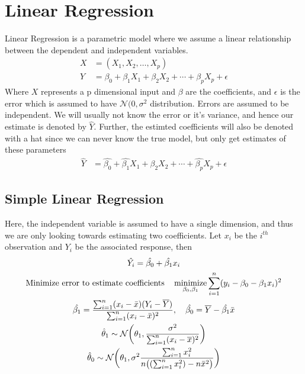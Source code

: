 \documentclass[../statistical_learning_notes.tex]{subfiles}
\begin{document}
\chapter{Linear Regression}
Linear Regression is a parametric model where we assume a linear relationship between the dependent and independent variables.
\begin{align*}
    X &= (X_{1}, X_{2}, \ldots, X_{p})\\
    Y &= \beta_{0} + \beta_{1}X_{1} + \beta_{2}X_{2} + \cdots + \beta_{p}X_{p} + \epsilon
\end{align*}
Where $X$ represents a p dimensional input and $\beta$ are the coefficients, and $\epsilon$ is the error which is assumed to have $\mathcal{N}(0, \sigma^{2}$ distribution. Errors are assumed to be independent. We will usually not know the error or it's variance, and hence our estimate is denoted by $\hat{Y}$. Further, the estimted coefficients will also be denoted with a hat since we can never know the true model, but only get estimates of these parameters
\begin{align*}
    \hat{Y} &= \hat{\beta_{0}} + \hat{\beta_{1}}X_{1} + \beta_{2}X_{2} + \cdots + \hat{\beta_{p}}X_{p} + \epsilon
\end{align*}

\section{Simple Linear Regression}
Here, the independent variable is assumed to have a single dimension, and thus we are only looking towards estimating two coefficients. Let $x_{i}$ be the $i^{th}$ observation and ${Y_{i}}$ be the associated response, then 
\begin{gather*}
    \hat{Y_{i}} = \hat{\beta_{0}} + \hat{\beta_{1}}x_{i}\\
    \text{Minimize error to estimate coefficients} \quad \operatorname*{minimize}_{\beta_{0}, \beta_{1}} \sum_{i=1}^{n} (y_{i} - \beta_{0} - \beta_{1}x_{i})^{2}\\
    \hat{\beta_{1}} = \frac{\sum_{i=1}^{n}(x_{i} - \bar{x})(Y_{i} - \overline{Y})}{\sum_{i=1}^{n} (x_{i} - \bar{x})^{2}}, \quad \hat{\beta_{0}} = \overline{Y} - \hat{\beta_{1}}\bar{x}\\
    \hat{\theta}_{1} \sim \mathcal{N}\bigg(\theta_{1}, \frac{\sigma^{2}}{\sum_{i=1}^{n}(x_{i} - \overline{x})^{2}} \bigg)\\
    \hat{\theta}_{0} \sim \mathcal{N}\bigg(\theta_{1}, \sigma^{2} \frac{\sum_{i=1}^{n} x_{i}^{2}}{n\big((\sum_{i=1}^{n} x_{i}^{2}) - n\bar{x}^{2} \big)} \bigg)
\end{gather*}
\end{document}
